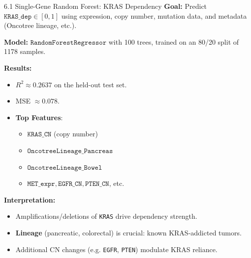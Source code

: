 \documentclass[10pt]{beamer}
\begin{document}

\begin{frame}{6.1 Single-Gene Random Forest: KRAS Dependency}
  \textbf{Goal:} Predict \(\texttt{KRAS\_dep} \in [0, 1]\) using expression, copy number, mutation data,
  and metadata (Oncotree lineage, etc.).

  \vspace{0.3cm}
  \textbf{Model:} \(\texttt{RandomForestRegressor}\) with 100 trees, trained on an 80/20 split of 1178 samples.

  \vspace{0.2cm}
  \textbf{Results:}
  \begin{itemize}
    \item \(R^2 \approx 0.2637\) on the held-out test set.
    \item MSE \(\approx 0.078\).
    \item \textbf{Top Features}:
      \begin{itemize}
        \item \(\texttt{KRAS\_CN}\) (copy number) 
        \item \(\texttt{OncotreeLineage\_Pancreas}\)
        \item \(\texttt{OncotreeLineage\_Bowel}\)
        \item \(\texttt{MET\_expr}, \texttt{EGFR\_CN}, \texttt{PTEN\_CN}\), etc.
      \end{itemize}
  \end{itemize}

  \vspace{0.1cm}
  \textbf{Interpretation:}
  \begin{itemize}
    \item Amplifications/deletions of \texttt{KRAS} drive dependency strength.
    \item \textbf{Lineage} (pancreatic, colorectal) is crucial: known KRAS-addicted tumors.
    \item Additional CN changes (e.g. \texttt{EGFR}, \texttt{PTEN}) modulate KRAS reliance.
  \end{itemize}
\end{frame}
\end{document}
